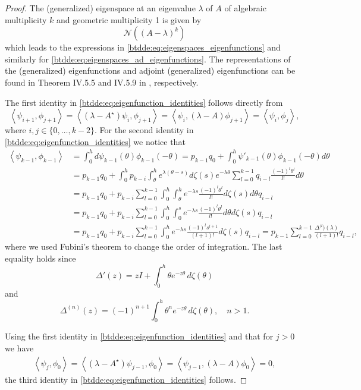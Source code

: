\begin{proof}
The (generalized) eigenspace at an eigenvalue $\lambda$ of $A$ of algebraic multiplicity $k$ and geometric multiplicity 1 is given by 
\[
\mathcal{N}((A-\lambda)^k)
\]
which leads to the expressions in \cref{btdde:eq:eigenspaces_eigenfunctions}
and similarly for \cref{btdde:eq:eigenspaces_ad_eigenfunctions}. The representations
of the (generalized) eigenfunctions and adjoint (generalized) eigenfunctions
can be found in Theorem IV.5.5 and IV.5.9 in \cite{diekmann1995delay}, respectively.

The first identity in \cref{btdde:eq:eigenfunction_identities} follows directly from
\[
    \left<\psi_{i + 1},\phi_{j + 1}\right> = \left<(\lambda-A^\star)\psi_i,\phi_{j + 1}\right>
    = \left<\psi_i,(\lambda-A)\phi_{j + 1}\right>
    = \left<\psi_i,\phi_j\right>,
\]
where $i,j\in\{0,\dots,k-2\}$.
For the second identity in \cref{btdde:eq:eigenfunction_identities} we notice that
\begin{align*}
    \left<\psi_{k-1},\phi_{k-1}\right> 
        &= \int_0^h d\psi_{k-1}(\theta) \phi_{k-1}(-\theta) 
         = p_{k-1}q_0 + \int_0^h \psi'_{k-1}(\theta) \phi_{k-1}(-\theta) d\theta \\
        &=  p_{k-1}q_0 + \int_0^h p_{k-i} \int_{\theta}^h e^{\lambda(\theta-s)} d\zeta(s) 
                e^{-\lambda\theta} \sum_{l=0}^{k-1} q_{i-l} \frac{(-1)^l\theta^l}{l!}d\theta \\
        &=  p_{k-1}q_0 + p_{k-i} \sum_{l=0}^{k-1} \int_0^h \int_{\theta}^h e^{-\lambda s}  
                \frac{(-1)^l\theta^l}{l!} d\zeta(s) d\theta  q_{i-l}\\
        &=  p_{k-1}q_0 + p_{k-i} \sum_{l=0}^{k-1} \int_0^h \int_0^s e^{-\lambda s}  
                \frac{(-1)^l\theta^l}{l!}d\theta  d\zeta(s) q_{i-l}\\
        &=  p_{k-1}q_0 + p_{k-i} \sum_{l=0}^{k-1} \int_0^h  e^{-\lambda s}  
            \frac{(-1)^l s^{l + 1}}{(l + 1)!} d\zeta(s) q_{i-l}
        = p_{k-1} \sum_{l=0}^{k-1} \frac{\Delta^{(l})(\lambda)}{(l + 1)!} q_{i-l},
\end{align*}
where we used Fubini\textquoteright s theorem to change the order of
integration. The last equality holds since
\[
\Delta'(z) =  zI + \int_0^h{\theta e^{-z\theta}\,d\zeta(\theta)} 
\]
and
\[
\Delta^{(n)}(z) =  (-1)^{n + 1}\int_0^h{\theta^n e^{-z\theta}\,d\zeta(\theta)}, \quad n > 1.
\]

Using the first identity in \cref{btdde:eq:eigenfunction_identities} and that for $j>0$ we have
\begin{align*}
    \left< \psi_j,\phi_0\right> = \left< (\lambda-A^\star)\psi_{j-1},\phi_0\right> 
                                = \left< \psi_{j-1},(\lambda-A)\phi_0\right> = 0,
\end{align*}
the third identity in \cref{btdde:eq:eigenfunction_identities} follows.


\end{proof}
